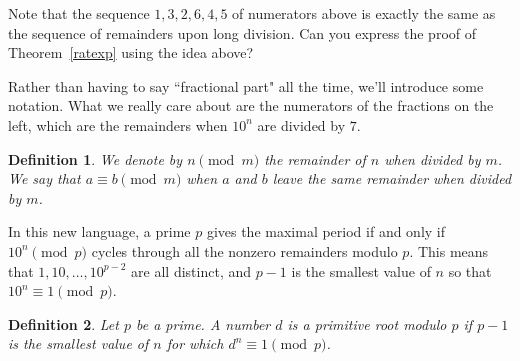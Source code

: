 \documentclass[12pt,twoside]{article}
\theoremstyle{norm}
\newtheorem{df}{Definition}
\newcommand{\rc}[1]{\frac{1}{#1}}
\begin{document}
Note that the sequence $1,3,2,6,4,5$ of numerators above is exactly the same as the sequence of remainders upon long division. Can you express the proof of Theorem~\ref{ratexp} using the idea above?

Rather than having to say ``fractional part" all the time, we'll introduce some notation. What we really care about are the numerators of the fractions on the left, which are the remainders when $10^n$ are divided by $7$.
\begin{df}
We denote by $n\pmod{m}$ the remainder of $n$ when divided by $m$. We say that $a\equiv b\pmod{m}$ when $a$ and $b$ leave the same remainder when divided by $m$.
\end{df}
In this new language, a prime $p$ gives the maximal period if and only if $10^n\pmod{p}$ cycles through all the nonzero remainders modulo $p$. This means that $1, 10, \ldots, 10^{p-2}$ are all distinct, and $p-1$ is the smallest value of $n$ so that $10^n\equiv 1\pmod{p}$. %
\begin{df}
Let $p$ be a prime. A number $d$ is a primitive root modulo $p$ if $p-1$ is the smallest value of $n$ for which $d^{n}\equiv 1\pmod{p}$.
\end{df}
\end{document}
